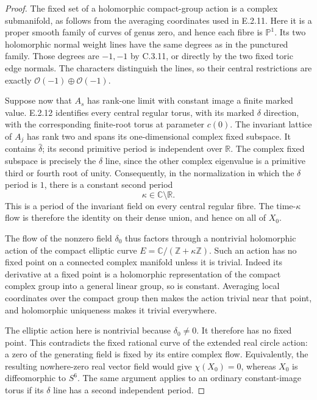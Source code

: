 \begin{proof}
The fixed set of a holomorphic compact-group
action is a complex submanifold, as follows
from the averaging coordinates used in
E.2.11.  Here it is a proper smooth family
of curves of genus zero, and hence each fibre
is $\mathbb P^1$.  Its two holomorphic normal
weight lines have the same degrees as in
the punctured family.  Those degrees are
$-1,-1$ by C.3.11, or directly by the two
fixed toric edge normals.  The characters
distinguish the lines, so their central
restrictions are exactly
$\mathcal O(-1)\oplus\mathcal O(-1)$.

Suppose now that $A_s$ has rank-one limit
with constant image a finite marked value.
E.2.12 identifies every central regular
torus, with its marked $\delta$ direction,
with the corresponding finite-root torus
at parameter $c(0)$.  The invariant lattice
of $A_j$ has rank two and spans its
one-dimensional complex fixed subspace.
It contains $\widehat\delta$; its second
primitive period is independent over
$\mathbb R$.  The complex fixed subspace
is precisely the $\delta$ line, since
the other complex eigenvalue is a
primitive third or fourth root of unity.
Consequently, in the normalization in
which the $\delta$ period is $1$, there
is a constant second period
\[
 \kappa\in\mathbb C\setminus\mathbb R.
\]
This is a period of the invariant field
on every central regular fibre.  The
time-$\kappa$ flow is therefore the
identity on their dense union, and
hence on all of $X_0$.

The flow of the nonzero field $\delta_0$
thus factors through a nontrivial
holomorphic action of the compact
elliptic curve
$E=\mathbb C/(\mathbb Z+\kappa\mathbb Z)$.
Such an action has no fixed point on
a connected complex manifold unless
it is trivial.  Indeed its derivative
at a fixed point is a holomorphic
representation of the compact complex
group into a general linear group,
so is constant.  Averaging local
coordinates over the compact group
then makes the action trivial near
that point, and holomorphic uniqueness
makes it trivial everywhere.

The elliptic action here is nontrivial
because $\delta_0\ne0$.  It therefore
has no fixed point.  This contradicts
the fixed rational curve of the
extended real circle action: a zero
of the generating field is fixed
by its entire complex flow.  Equivalently,
the resulting nowhere-zero real vector
field would give $\chi(X_0)=0$,
whereas $X_0$ is diffeomorphic to $S^6$.
The same argument applies to an ordinary
constant-image torus if its $\delta$
line has a second independent period.
\end{proof}

